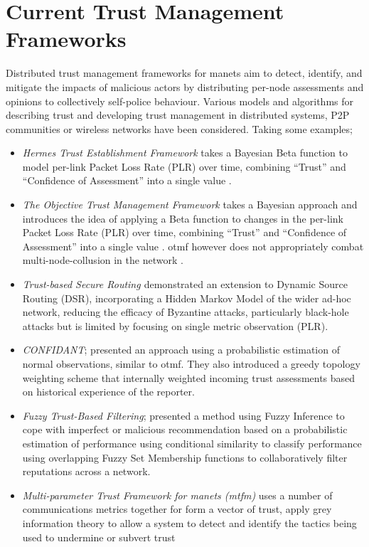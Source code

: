 \section{Current Trust Management Frameworks}
Distributed trust management frameworks for \gls{manet}s aim to detect, identify, and mitigate the impacts of malicious actors by distributing per-node assessments and opinions to collectively self-police behaviour.
Various models and algorithms for describing trust and developing trust management in distributed systems, P2P communities or wireless networks have been considered.
Taking some examples;
\begin{itemize}
  \item \emph{Hermes Trust Establishment Framework} takes a Bayesian Beta function to model per-link Packet Loss Rate (PLR) over time, combining ``Trust'' and ``Confidence of Assessment'' into a single value \cite{Zouridaki2005}.
  \item \emph{The Objective Trust Management Framework} takes a Bayesian approach and introduces the idea of applying a Beta function to changes in the per-link Packet Loss Rate (PLR) over time, combining ``Trust'' and ``Confidence of Assessment'' into a single value \cite{Li2008}.
    \acrshort{otmf} however does not appropriately combat multi-node-collusion in the network \cite{Cho2011}.
  \item \emph{Trust-based Secure Routing \cite{Moe2008a}} demonstrated an extension to Dynamic Source Routing (DSR), incorporating a Hidden Markov Model of the wider ad-hoc network, reducing the efficacy of Byzantine attacks, particularly black-hole attacks but is limited by focusing on single metric observation (PLR)\cite{Cho2011}.
  \item \emph{CONFIDANT}; \cite{Buchegger2002} presented an approach using a probabilistic estimation of normal observations, similar to \acrshort{otmf}.
    They also introduced a greedy topology weighting scheme that internally weighted incoming trust assessments based on historical experience of the reporter.
  \item \emph{Fuzzy Trust-Based Filtering}; \cite{Luo2008} presented a method using Fuzzy Inference to cope with imperfect or malicious recommendation based on a probabilistic estimation of performance using conditional similarity to classify performance using overlapping Fuzzy Set Membership functions to collaboratively filter reputations across a network.
  \item \emph{Multi-parameter Trust Framework for \glspl{manet} (\acrshort{mtfm})} uses a number of communications metrics together for form a vector of trust, apply grey information theory to allow a system to detect and identify the tactics being used to undermine or subvert trust\cite{Guo11}
\end{itemize}
